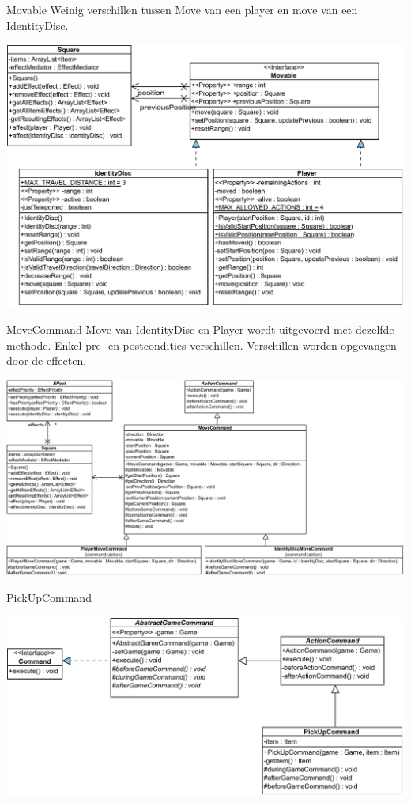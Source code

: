 \documentclass[11pt,t]{beamer}
\begin{document}
\begin{frame}{Movable}
Weinig verschillen tussen Move van een player en move van een IdentityDisc.
\begin{center}
\includegraphics[width=0.8\linewidth]{images/movable}
\end{center}
\end{frame}

\begin{frame}{MoveCommand}
Move van IdentityDisc en Player wordt uitgevoerd met dezelfde methode. Enkel pre- en postcondities verschillen. Verschillen worden opgevangen door de effecten.
\begin{center}
\includegraphics[width=0.95\linewidth]{images/movecommand}
\end{center}
\end{frame}

\begin{frame}{PickUpCommand}
\begin{center}
\includegraphics[width=0.95\linewidth]{images/pickupcommand}
\end{center}
\end{frame}
\end{document}
